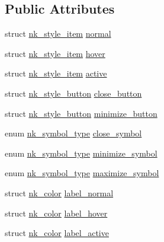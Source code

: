 \subsection*{Public Attributes}
\begin{DoxyCompactItemize}
\item 
struct \mbox{\hyperlink{structnk__style__item}{nk\+\_\+style\+\_\+item}} \mbox{\hyperlink{structnk__style__window__header_a60e54f5a43fc8963247f8ee035dbb44e}{normal}}
\item 
struct \mbox{\hyperlink{structnk__style__item}{nk\+\_\+style\+\_\+item}} \mbox{\hyperlink{structnk__style__window__header_af3467d4e76b52493aaac1c56feb78d88}{hover}}
\item 
struct \mbox{\hyperlink{structnk__style__item}{nk\+\_\+style\+\_\+item}} \mbox{\hyperlink{structnk__style__window__header_a59505c74fca60c0a6c8b2e8ebe8e4c4a}{active}}
\item 
struct \mbox{\hyperlink{structnk__style__button}{nk\+\_\+style\+\_\+button}} \mbox{\hyperlink{structnk__style__window__header_a1ca819b7f0dffcdeee9deaf7c9f6d5ce}{close\+\_\+button}}
\item 
struct \mbox{\hyperlink{structnk__style__button}{nk\+\_\+style\+\_\+button}} \mbox{\hyperlink{structnk__style__window__header_a492a9e48e37f089794368ebe4339440a}{minimize\+\_\+button}}
\item 
enum \mbox{\hyperlink{nuklear_8h_a29b4aaa400d0ce28aea3c8c9c372ac07}{nk\+\_\+symbol\+\_\+type}} \mbox{\hyperlink{structnk__style__window__header_a4462aa46088c539b1ccdcc2ddb0cd66e}{close\+\_\+symbol}}
\item 
enum \mbox{\hyperlink{nuklear_8h_a29b4aaa400d0ce28aea3c8c9c372ac07}{nk\+\_\+symbol\+\_\+type}} \mbox{\hyperlink{structnk__style__window__header_ab734ca0639f56dde1f263dce6868e527}{minimize\+\_\+symbol}}
\item 
enum \mbox{\hyperlink{nuklear_8h_a29b4aaa400d0ce28aea3c8c9c372ac07}{nk\+\_\+symbol\+\_\+type}} \mbox{\hyperlink{structnk__style__window__header_ad45757a0d00f6c46fa4f6c10fe9d526c}{maximize\+\_\+symbol}}
\item 
struct \mbox{\hyperlink{structnk__color}{nk\+\_\+color}} \mbox{\hyperlink{structnk__style__window__header_aa53277062d4275d5e7bb0aa5fd14cb41}{label\+\_\+normal}}
\item 
struct \mbox{\hyperlink{structnk__color}{nk\+\_\+color}} \mbox{\hyperlink{structnk__style__window__header_a649c485bd48904cc10427f72ee846228}{label\+\_\+hover}}
\item 
struct \mbox{\hyperlink{structnk__color}{nk\+\_\+color}} \mbox{\hyperlink{structnk__style__window__header_a765cc5c0b858988506b99a0664e3ebc8}{label\+\_\+active}}

\end{DoxyCompactItemize}
